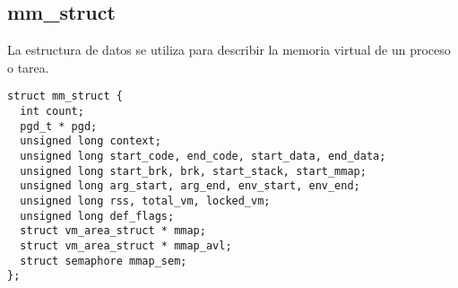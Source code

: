 \subsection*{mm\_struct}

La estructura de datos  se utiliza para describir la
memoria virtual de un proceso o tarea.
\begin{tscreen}\begin{verbatim}
struct mm_struct {
  int count;
  pgd_t * pgd;
  unsigned long context;
  unsigned long start_code, end_code, start_data, end_data;
  unsigned long start_brk, brk, start_stack, start_mmap;
  unsigned long arg_start, arg_end, env_start, env_end;
  unsigned long rss, total_vm, locked_vm;
  unsigned long def_flags;
  struct vm_area_struct * mmap;
  struct vm_area_struct * mmap_avl;
  struct semaphore mmap_sem;
};
\end{verbatim}\end{tscreen}

